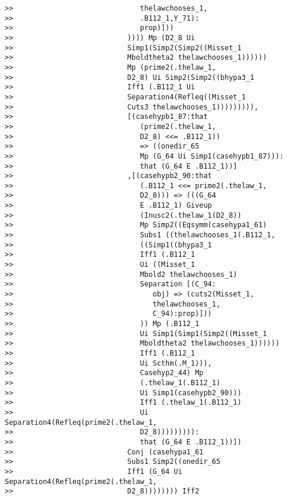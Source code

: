 \documentclass[12pt]{article}
\begin{document}
\begin{verbatim}
>>                              thelawchooses_1,
>>                              .B112_1,Y_71):
>>                              prop)]))
>>                           )))) Mp (D2_8 Ui
>>                           Simp1(Simp2(Simp2((Misset_1
>>                           Mboldtheta2 thelawchooses_1))))))
>>                           Mp (prime2(.thelaw_1,
>>                           D2_8) Ui Simp2(Simp2((bhypa3_1
>>                           Iff1 (.B112_1 Ui
>>                           Separation4(Refleq((Misset_1
>>                           Cuts3 thelawchooses_1))))))))),
>>                           [(casehypb1_87:that
>>                              (prime2(.thelaw_1,
>>                              D2_8) <<= .B112_1))
>>                              => ((onedir_65
>>                              Mp (G_64 Ui Simp1(casehypb1_87))):
>>                              that (G_64 E .B112_1))]
>>                           ,[(casehypb2_90:that
>>                              (.B112_1 <<= prime2(.thelaw_1,
>>                              D2_8))) => (((G_64
>>                              E .B112_1) Giveup
>>                              (Inusc2(.thelaw_1(D2_8))
>>                              Mp Simp2((Eqsymm(casehypa1_61)
>>                              Subs1 ((thelawchooses_1(.B112_1,
>>                              ((Simp1((bhypa3_1
>>                              Iff1 (.B112_1
>>                              Ui ((Misset_1
>>                              Mbold2 thelawchooses_1)
>>                              Separation [(C_94:
>>                                 obj) => (cuts2(Misset_1,
>>                                 thelawchooses_1,
>>                                 C_94):prop)]))
>>                              )) Mp (.B112_1
>>                              Ui Simp1(Simp1(Simp2((Misset_1
>>                              Mboldtheta2 thelawchooses_1))))))
>>                              Iff1 (.B112_1
>>                              Ui Scthm(.M_1))),
>>                              Casehyp2_44) Mp
>>                              (.thelaw_1(.B112_1)
>>                              Ui Simp1(casehypb2_90)))
>>                              Iff1 (.thelaw_1(.B112_1)
>>                              Ui Separation4(Refleq(prime2(.thelaw_1,
>>                              D2_8))))))))):
>>                              that (G_64 E .B112_1))])
>>                           Conj (casehypa1_61
>>                           Subs1 Simp2((onedir_65
>>                           Iff1 (G_64 Ui Separation4(Refleq(prime2(.thelaw_1,
>>                           D2_8)))))))) Iff2

\end{verbatim}
\end{document}
